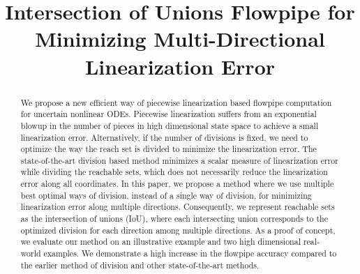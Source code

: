 


\title{Intersection of Unions Flowpipe for Minimizing Multi-Directional Linearization Error}
\author{}
\institute{}
%
    
\maketitle
%
\begin{abstract}
We propose a new efficient way of piecewise linearization based
flowpipe computation for uncertain nonlinear ODEs.  
Piecewise
linearization suffers from an exponential blowup in the number of pieces
in high dimensional state space to achieve a small linearization error.
Alternatively, if the number of
divisions is fixed, we need to optimize the way the reach set is
divided to minimize the linearization error. 
The state-of-the-art division based method minimizes a scalar measure of linearization error while dividing the reachable sets, which does not necessarily
reduce the linearization error along all coordinates.  
In this paper, we propose a method where we use multiple best optimal ways of division, instead of a single way of division, for minimizing linearization error along multiple directions. Consequently, we
represent reachable sets as the intersection of unions
(IoU), where each intersecting union corresponds to the optimized
division for each direction among multiple directions.  As a proof of
concept, we evaluate our method on an illustrative example and two
high dimensional real-world examples.  We demonstrate a high increase
in the flowpipe accuracy compared to the earlier method of division
and other state-of-the-art methods.

\end{abstract}

